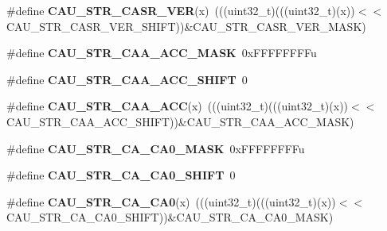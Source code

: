 \begin{DoxyCompactItemize}
\item 
\#define {\bfseries C\+A\+U\+\_\+\+S\+T\+R\+\_\+\+C\+A\+S\+R\+\_\+\+V\+ER}(x)~(((uint32\+\_\+t)(((uint32\+\_\+t)(x))$<$$<$C\+A\+U\+\_\+\+S\+T\+R\+\_\+\+C\+A\+S\+R\+\_\+\+V\+E\+R\+\_\+\+S\+H\+I\+FT))\&C\+A\+U\+\_\+\+S\+T\+R\+\_\+\+C\+A\+S\+R\+\_\+\+V\+E\+R\+\_\+\+M\+A\+SK)\hypertarget{group__CAU__Register__Masks_ga1b0d6cb73fdaaf5a5d9adc1c95d296c6}{}\label{group__CAU__Register__Masks_ga1b0d6cb73fdaaf5a5d9adc1c95d296c6}

\item 
\#define {\bfseries C\+A\+U\+\_\+\+S\+T\+R\+\_\+\+C\+A\+A\+\_\+\+A\+C\+C\+\_\+\+M\+A\+SK}~0x\+F\+F\+F\+F\+F\+F\+F\+Fu\hypertarget{group__CAU__Register__Masks_gafdeac08a5e2a414586e6cfb318a3beca}{}\label{group__CAU__Register__Masks_gafdeac08a5e2a414586e6cfb318a3beca}

\item 
\#define {\bfseries C\+A\+U\+\_\+\+S\+T\+R\+\_\+\+C\+A\+A\+\_\+\+A\+C\+C\+\_\+\+S\+H\+I\+FT}~0\hypertarget{group__CAU__Register__Masks_gaad9cefe85fb570468c92429a601f3c30}{}\label{group__CAU__Register__Masks_gaad9cefe85fb570468c92429a601f3c30}

\item 
\#define {\bfseries C\+A\+U\+\_\+\+S\+T\+R\+\_\+\+C\+A\+A\+\_\+\+A\+CC}(x)~(((uint32\+\_\+t)(((uint32\+\_\+t)(x))$<$$<$C\+A\+U\+\_\+\+S\+T\+R\+\_\+\+C\+A\+A\+\_\+\+A\+C\+C\+\_\+\+S\+H\+I\+FT))\&C\+A\+U\+\_\+\+S\+T\+R\+\_\+\+C\+A\+A\+\_\+\+A\+C\+C\+\_\+\+M\+A\+SK)\hypertarget{group__CAU__Register__Masks_ga4866a4555a25ed3cc3d5b1270b619834}{}\label{group__CAU__Register__Masks_ga4866a4555a25ed3cc3d5b1270b619834}

\item 
\#define {\bfseries C\+A\+U\+\_\+\+S\+T\+R\+\_\+\+C\+A\+\_\+\+C\+A0\+\_\+\+M\+A\+SK}~0x\+F\+F\+F\+F\+F\+F\+F\+Fu\hypertarget{group__CAU__Register__Masks_ga7490044c911fb60ad77baacec88b73a0}{}\label{group__CAU__Register__Masks_ga7490044c911fb60ad77baacec88b73a0}

\item 
\#define {\bfseries C\+A\+U\+\_\+\+S\+T\+R\+\_\+\+C\+A\+\_\+\+C\+A0\+\_\+\+S\+H\+I\+FT}~0\hypertarget{group__CAU__Register__Masks_ga80d0808b0ed4fd4b825e2409ecc79ce7}{}\label{group__CAU__Register__Masks_ga80d0808b0ed4fd4b825e2409ecc79ce7}

\item 
\#define {\bfseries C\+A\+U\+\_\+\+S\+T\+R\+\_\+\+C\+A\+\_\+\+C\+A0}(x)~(((uint32\+\_\+t)(((uint32\+\_\+t)(x))$<$$<$C\+A\+U\+\_\+\+S\+T\+R\+\_\+\+C\+A\+\_\+\+C\+A0\+\_\+\+S\+H\+I\+FT))\&C\+A\+U\+\_\+\+S\+T\+R\+\_\+\+C\+A\+\_\+\+C\+A0\+\_\+\+M\+A\+SK)\hypertarget{group__CAU__Register__Masks_ga499b6aa3c87a5c219ee34ffec4b8c807}{}\label{group__CAU__Register__Masks_ga499b6aa3c87a5c219ee34ffec4b8c807}


\end{DoxyCompactItemize}
